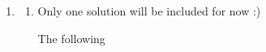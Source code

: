 \documentclass[12pt]{article}
\begin{document}
\begin{enumerate}[1.]









        \item

        \begin{enumerate}[1.]
            \item Only one solution will be included for now :)

            The following


\end{enumerate}
\end{enumerate}
\end{document}
